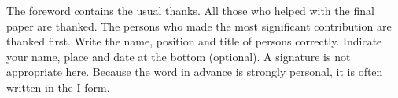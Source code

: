 

The foreword contains the usual thanks. All those who helped with the final paper are thanked. 
The persons who made the most significant contribution are thanked first. Write the name, position and title of persons correctly. 
Indicate your name, place and date at the bottom (optional). A signature is not appropriate here. 
Because the word in advance is strongly personal, it is often written in the I form. 